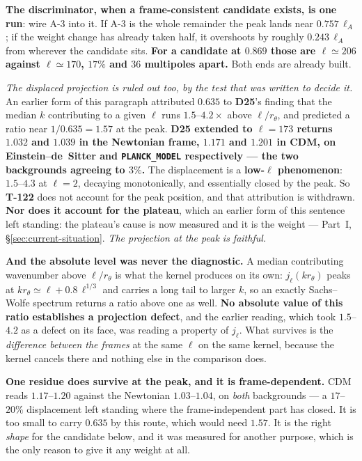 \textbf{The discriminator, when a frame-consistent candidate exists, is one
run}: wire A-3 into it. If A-3 is the whole remainder the peak lands near
$0.757\,\ell_A$; if the weight change has already taken half, it overshoots by
roughly $0.243\,\ell_A$ from wherever the candidate sits. \textbf{For a
candidate at $0.869$ those are $\ell\simeq206$ against $\ell\simeq170$, $17\%$
and $36$ multipoles apart.} Both ends are already built.

\emph{The displaced projection is ruled out too, by the test that was written
to decide it.} An earlier form of this paragraph attributed $0.635$ to
\textbf{D25}'s finding that the median $k$ contributing to a given $\ell$ runs
$1.5$--$4.2\times$ above $\ell/r_\theta$, and predicted a ratio near
$1/0.635=1.57$ at the peak. \textbf{D25 extended to $\ell=173$ returns
$1.032$ and $1.039$ in the Newtonian frame, $1.171$ and $1.201$ in CDM, on
Einstein--de~Sitter and \texttt{PLANCK\_MODEL} respectively --- the two
backgrounds agreeing to $3\%$.} The displacement is a \textbf{low-$\ell$
phenomenon}: $1.5$--$4.3$ at $\ell=2$, decaying monotonically, and essentially
closed by the peak. So \textbf{T-122} does not account for the peak position,
and that attribution is withdrawn. \textbf{Nor does it account for the
plateau}, which an earlier form of this sentence left standing: the plateau's
cause is now measured and it is the weight --- Part~I,
\S\ref{sec:current-situation}. \emph{The projection at the peak is
faithful.}

\textbf{And the absolute level was never the diagnostic.} A median contributing
wavenumber above $\ell/r_\theta$ is what the kernel produces on its own:
$j_\ell(kr_\theta)$ peaks at $kr_\theta\simeq\ell+0.8\,\ell^{1/3}$ and carries a
long tail to larger $k$, so an exactly Sachs--Wolfe spectrum returns a ratio
above one as well. \textbf{No absolute value of this ratio establishes a
projection defect}, and the earlier reading, which took $1.5$--$4.2$ as a
defect on its face, was reading a property of $j_\ell$. What survives is the
\emph{difference between the frames} at the same $\ell$ on the same kernel,
because the kernel cancels there and nothing else in the comparison does.

\textbf{One residue does survive at the peak, and it is frame-dependent.} CDM
reads $1.17$--$1.20$ against the Newtonian $1.03$--$1.04$, on \emph{both}
backgrounds --- a $17$--$20\%$ displacement left standing where the
frame-independent part has closed. It is too small to carry $0.635$ by this
route, which would need $1.57$. It is the right \emph{shape} for the candidate
below, and it was measured for another purpose, which is the only reason to
give it any weight at all.

